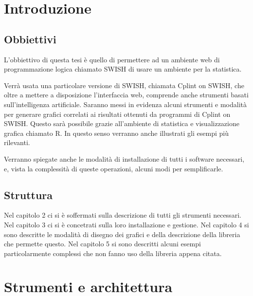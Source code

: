 \documentclass[10pt,titlepage,twoside,a4paper]{report}
\begin{document}
\restoregeometry


\newpage
\tableofcontents
\newpage
\listoffigures
\newpage
\listoflistings
\cleardoublepage





\chapter{Introduzione}
\label{ch:introduzione}
    \section{Obbiettivi}
L'obbiettivo di questa tesi è quello di permettere ad un ambiente web di 
programmazione logica chiamato SWISH di usare un ambiente per la statistica.

Verrà usata una particolare versione di SWISH, chiamata Cplint on SWISH,
che oltre a mettere a disposizione l'interfaccia web, comprende anche 
strumenti basati sull'intelligenza artificiale. Saranno 
messi in evidenza alcuni strumenti e modalità per generare grafici correlati 
ai risultati ottenuti da programmi di Cplint on SWISH. Questo sarà 
possibile grazie all'ambiente di statistica e visualizzazione grafica chiamato 
R. In questo senso verranno anche illustrati gli esempi più rilevanti.

Verranno spiegate anche le modalità di installazione di tutti i software
necessari, e, vista la complessità di queste operazioni, alcuni modi per 
semplificarle.

    \section{Struttura}
Nel capitolo 2 ci si è soffermati sulla descrizione di tutti gli strumenti 
necessari. Nel capitolo 3 ci si è concetrati sulla loro installazione e 
gestione. Nel capitolo 4 si sono descritte le modalità di disegno dei 
grafici e della descrizione della libreria che permette questo. Nel capitolo 5 
si sono descritti alcuni esempi particolarmente complessi che non fanno uso 
della libreria appena citata.




\chapter{Strumenti e architettura}
\end{document}
